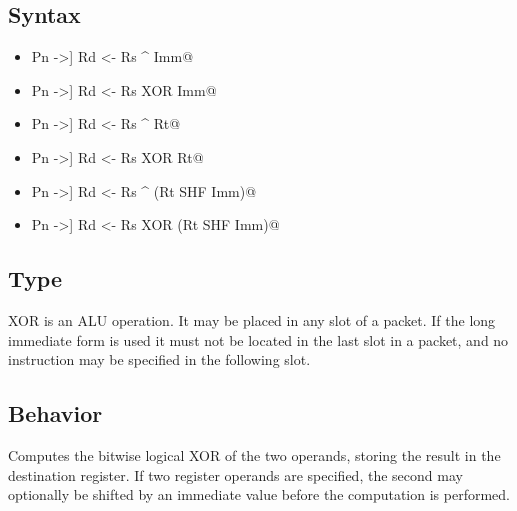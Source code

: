 \documentclass[11pt,openany]{report}
\begin{document}
\subsection{Syntax}

\begin{itemize}
  \item \verb@[[!]Pn ->] Rd <- Rs ^ Imm@
  \item \verb@[[!]Pn ->] Rd <- Rs XOR Imm@
  \item \verb@[[!]Pn ->] Rd <- Rs ^ Rt@
  \item \verb@[[!]Pn ->] Rd <- Rs XOR Rt@
  \item \verb@[[!]Pn ->] Rd <- Rs ^ (Rt SHF Imm)@
  \item \verb@[[!]Pn ->] Rd <- Rs XOR (Rt SHF Imm)@
\end{itemize}

\subsection{Type}
XOR is an ALU operation. It may be placed in any slot of a packet. If the long immediate form is used it must not be located in the last slot in a packet, and no instruction may be specified in the following slot.

\subsection{Behavior}
Computes the bitwise logical XOR of the two operands, storing the result in the destination register. If two register operands are specified, the second may optionally be shifted by an immediate value before the computation is performed.
\end{document}

